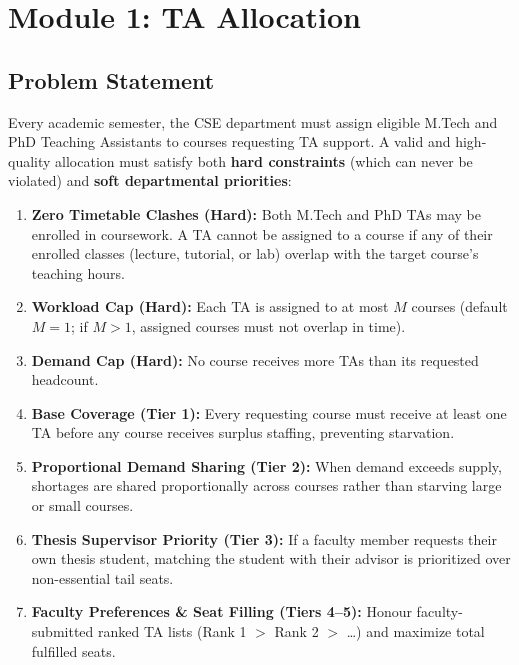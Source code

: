\documentclass[12pt,a4paper]{article}
\begin{document}
\section{Module 1: TA Allocation}

\subsection{Problem Statement}
Every academic semester, the CSE department must assign eligible M.Tech and PhD Teaching Assistants to courses requesting TA support. A valid and high-quality allocation must satisfy both \textbf{hard constraints} (which can never be violated) and \textbf{soft departmental priorities}:

\begin{enumerate}[leftmargin=*]
    \item \textbf{Zero Timetable Clashes (Hard):} Both M.Tech and PhD TAs may be enrolled in coursework. A TA cannot be assigned to a course if any of their enrolled classes (lecture, tutorial, or lab) overlap with the target course's teaching hours.
    \item \textbf{Workload Cap (Hard):} Each TA is assigned to at most $M$ courses (default $M = 1$; if $M > 1$, assigned courses must not overlap in time).
    \item \textbf{Demand Cap (Hard):} No course receives more TAs than its requested headcount.
    \item \textbf{Base Coverage (Tier 1):} Every requesting course must receive at least one TA before any course receives surplus staffing, preventing starvation.
    \item \textbf{Proportional Demand Sharing (Tier 2):} When demand exceeds supply, shortages are shared proportionally across courses rather than starving large or small courses.
    \item \textbf{Thesis Supervisor Priority (Tier 3):} If a faculty member requests their own thesis student, matching the student with their advisor is prioritized over non-essential tail seats.
    \item \textbf{Faculty Preferences \& Seat Filling (Tiers 4--5):} Honour faculty-submitted ranked TA lists (Rank 1 $>$ Rank 2 $>$ \dots) and maximize total fulfilled seats.
\end{enumerate}
\end{document}
